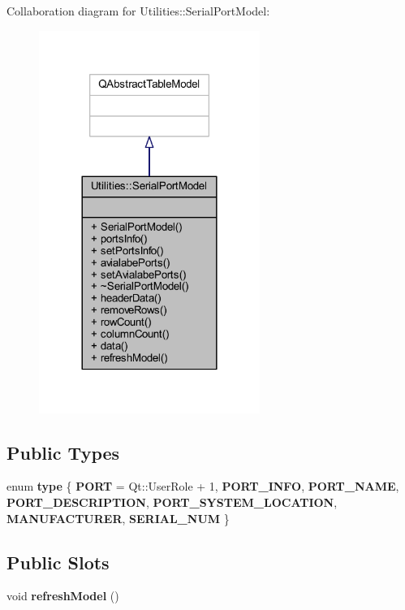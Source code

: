 Collaboration diagram for Utilities\+:\+:Serial\+Port\+Model\+:\nopagebreak
\begin{figure}[H]
\begin{center}
\leavevmode
\includegraphics[width=204pt]{dc/d1e/class_utilities_1_1_serial_port_model__coll__graph}
\end{center}
\end{figure}
\subsection*{Public Types}
\begin{DoxyCompactItemize}
\item 
\mbox{\label{class_utilities_1_1_serial_port_model_a1ed1937a512e4a7f9868207fa6cf3e14}} 
enum {\bfseries type} \{ \newline
{\bfseries P\+O\+RT} = Qt\+:\+:User\+Role + 1, 
{\bfseries P\+O\+R\+T\+\_\+\+I\+N\+FO}, 
{\bfseries P\+O\+R\+T\+\_\+\+N\+A\+ME}, 
{\bfseries P\+O\+R\+T\+\_\+\+D\+E\+S\+C\+R\+I\+P\+T\+I\+ON}, 
\newline
{\bfseries P\+O\+R\+T\+\_\+\+S\+Y\+S\+T\+E\+M\+\_\+\+L\+O\+C\+A\+T\+I\+ON}, 
{\bfseries M\+A\+N\+U\+F\+A\+C\+T\+U\+R\+ER}, 
{\bfseries S\+E\+R\+I\+A\+L\+\_\+\+N\+UM}
 \}
\end{DoxyCompactItemize}
\subsection*{Public Slots}
\begin{DoxyCompactItemize}
\item 
\mbox{\label{class_utilities_1_1_serial_port_model_ac6fd51a5d5c23815a21b7c38b82e3980}} 
void {\bfseries refresh\+Model} ()
\end{DoxyCompactItemize}
